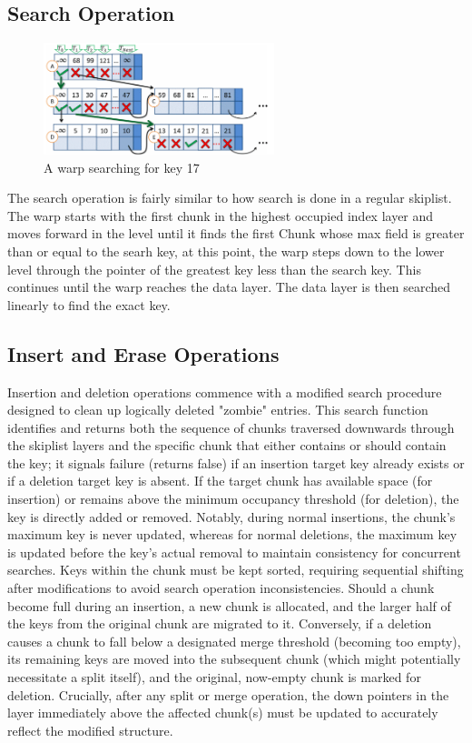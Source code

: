 \documentclass[12pt,a4paper]{article}
\begin{document}
\subsection{Search Operation}
\begin{figure}[H]
    \centering
    \includegraphics[width=0.6\textwidth]{4.png}
    \caption{A warp searching for key 17}
\end{figure}

The search operation is fairly similar to how search is done in a regular skiplist. The warp starts with the first chunk in the highest occupied index layer and moves forward in the level until it finds the first Chunk whose max field is greater than or equal to the searh key, at this point, the warp steps down to the lower level through the pointer of the greatest key less than the search key. This continues until the warp reaches the data layer. The data layer is then searched linearly to find the exact key.


\subsection{Insert and Erase Operations}
Insertion and deletion operations commence with a modified search procedure designed to clean up logically deleted "zombie" entries. This search function identifies and returns both the sequence of chunks traversed downwards through the skiplist layers and the specific chunk that either contains or should contain the key; it signals failure (returns false) if an insertion target key already exists or if a deletion target key is absent. If the target chunk has available space (for insertion) or remains above the minimum occupancy threshold (for deletion), the key is directly added or removed. Notably, during normal insertions, the chunk's maximum key is never updated, whereas for normal deletions, the maximum key is updated before the key's actual removal to maintain consistency for concurrent searches. Keys within the chunk must be kept sorted, requiring sequential shifting after modifications to avoid search operation inconsistencies. Should a chunk become full during an insertion, a new chunk is allocated, and the larger half of the keys from the original chunk are migrated to it. Conversely, if a deletion causes a chunk to fall below a designated merge threshold (becoming too empty), its remaining keys are moved into the subsequent chunk (which might potentially necessitate a split itself), and the original, now-empty chunk is marked for deletion. Crucially, after any split or merge operation, the down pointers in the layer immediately above the affected chunk(s) must be updated to accurately reflect the modified structure.
\end{document}

